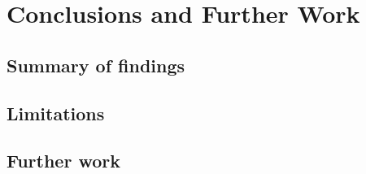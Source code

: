 \chapter{Conclusions and Further Work}
\label{ch:conclusions}

\section{Summary of findings}
\label{sec:conclusions-findings}

\section{Limitations}
\label{sec:conclusions-limitations}

\section{Further work}
\label{sec:conclusions-future}

